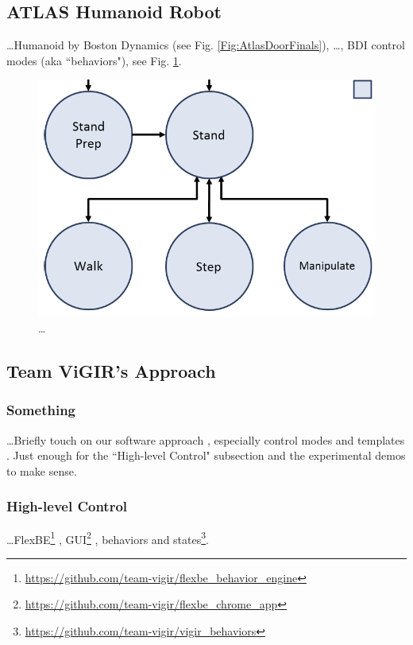 
\subsection{ATLAS Humanoid Robot}

\ldots Humanoid by Boston Dynamics (see Fig. \ref{Fig:AtlasDoorFinals}), \ldots, BDI control modes (aka ``behaviors"), see Fig. \ref{Fig:ControlModeTS}.

\begin{figure}[t]
\centering
\includegraphics[width=0.99\columnwidth,clip]{./img/control_modes_ts.png}
\caption{\ldots
}
\label{Fig:ControlModeTS}
\end{figure}

\subsection{Team ViGIR's Approach}

\subsubsection{Something}  \ldots Briefly touch on our software approach \cite{TeamViGIR2014JFR}, especially control modes and templates \cite{Alberto2014Humanoids}. Just enough for the ``High-level Control" subsection and the experimental demos to make sense.

\subsubsection{High-level Control} \ldots FlexBE\footnote{\scriptsize{\url{https://github.com/team-vigir/flexbe_behavior_engine}}}
, GUI\footnote{\scriptsize{\url{https://github.com/team-vigir/flexbe_chrome_app}}}
, behaviors and states\footnote{\scriptsize{\url{https://github.com/team-vigir/vigir_behaviors}}}.

